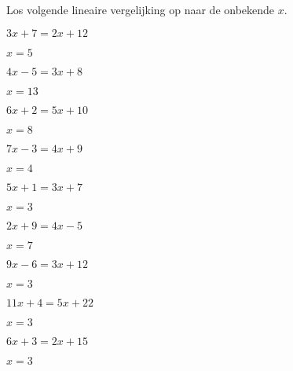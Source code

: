 \documentclass{ximera}
\begin{document}
	\author{Wiskunde Op Maat}

\begin{exercise} Los volgende lineaire vergelijking op naar de onbekende \(x\).
\begin{xmmulticols}
  
  \begin{question} \( 3x + 7  =  2x + 12    \) \begin{oplossing} \( x  = 5  \) \end{oplossing} \end{question}
  \begin{question} \( 4x - 5  =  3x + 8     \) \begin{oplossing} \( x  = 13 \) \end{oplossing} \end{question}
  \begin{question} \( 6x + 2  =  5x + 10    \) \begin{oplossing} \( x  = 8  \) \end{oplossing} \end{question}
  \begin{question} \( 7x - 3  =  4x + 9     \) \begin{oplossing} \( x  = 4  \) \end{oplossing} \end{question}
  \begin{question} \( 5x + 1  =  3x + 7     \) \begin{oplossing} \( x  = 3  \) \end{oplossing} \end{question}
  \begin{question} \( 2x + 9  =  4x - 5     \) \begin{oplossing} \( x  = 7  \) \end{oplossing} \end{question}
  \begin{question} \( 9x - 6  =  3x + 12    \) \begin{oplossing} \( x  = 3  \) \end{oplossing} \end{question}
  \begin{question} \( 11x + 4 =  5x + 22    \) \begin{oplossing} \( x  = 3  \) \end{oplossing} \end{question}
  \begin{question} \( 6x + 3  =  2x + 15    \) \begin{oplossing} \( x  = 3  \) \end{oplossing} \end{question}

\end{xmmulticols}
\end{exercise}
\end{document}

